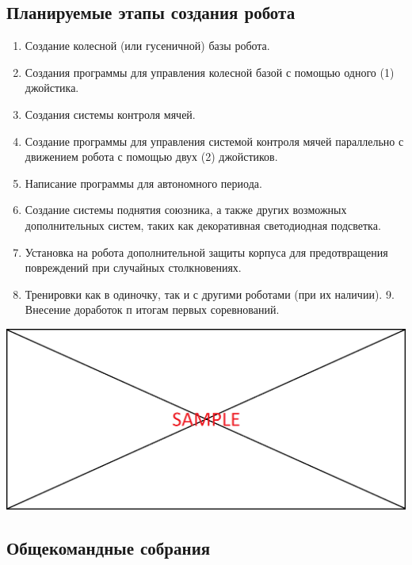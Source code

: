 \documentclass[11pt]{article}
\newcommand\measurepage{\dimexpr\pagegoal-\pagetotal-\baselineskip\relax}
\newcommand\fillpage{\includegraphics[width=\textwidth, height=\measurepage]{img/fill_page}}
\begin{document}
         \subsection{Планируемые этапы создания робота}
         \begin{enumerate}
            \item Создание колесной (или гусеничной) базы робота.
            \item Создания программы для управления колесной базой с помощью одного (1) джойстика.
            \item Создания системы контроля мячей.
            \item Создание программы для управления системой контроля мячей параллельно с движением робота с помощью двух (2) джойстиков.
            \item Написание программы для автономного периода.
            \item Создание системы поднятия союзника, а также других возможных дополнительных систем, таких как декоративная светодиодная подсветка.
            \item Установка на робота дополнительной защиты корпуса для предотвращения повреждений при случайных столкновениях.
            \item Тренировки как в одиночку, так и с другими роботами (при их наличии).
            9.   Внесение доработок п итогам первых соревнований.
         \end{enumerate}

         \fillpage

         \subsection{Общекомандные собрания}
\end{document}
